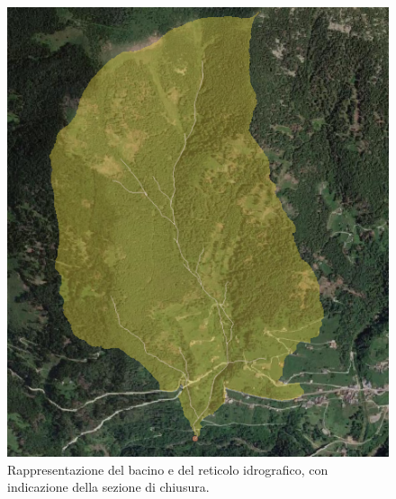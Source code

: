 \begin{figure}[H]
    \centering
    \includegraphics[scale=0.60]{immagini/bacino_reticolo_ombreg_qgis.PNG}
    \caption{Rappresentazione del bacino e del reticolo idrografico, con indicazione della sezione di chiusura.}
    \label{bacino_reticolo_qgis}
    \end{figure}


